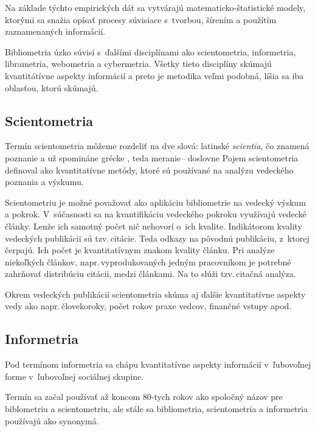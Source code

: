 Na základe týchto empirických dát sa vytvárajú matematicko-štatistické modely,
ktorými sa snažia opísať procesy súvisiace s~tvorbou, šírením a použítím
zaznamenaných informácií.

Bibliometria úzko súvisí s~ďalšími disciplínami ako scientometria, informetria,
librametria, webometria a cybermetria.  Všetky tieto disciplíny skúmajú
kvantitátívne aspekty informácií a preto je metodika veľmi podobná, líšia sa iba
oblasťou, ktorú skúmajú.


\subsection{Scientometria}

Termín scientometria môžeme rozdeliť na dve slová: latinské
\emph{scientia}, čo znamená poznanie a už
spomináne grécke , teda
meranie\,--\,doslovne  Pojem scientometria
\cite{Nalimov1969} definoval ako kvantitatívne metódy, ktoré sú používané na
analýzu vedeckého poznania a výskumu.

Scientometriu je možné považovať ako aplikáciu bibliometrie na vedecký výskum a
pokrok.  V~súčasnosti sa na kvantifikáciu vedeckého pokroku využívajú vedecké
články.  Lenže ich samotný počet nič nehovorí o~ich kvalite.  Indikátorom
kvality vedeckých publikácii sú tzv.\,citácie.  Teda odkazy na pôvodnú
publikáciu, z~ktorej čerpajú.  Ich počet je kvantitatívnym znakom kvality
článku.  Pri analýze niekoľkých článkov, napr.\,vyprodukovaných jedným
pracovníkom je potrebné zahrňovať distribúciu citácii, medzi článkami.  Na to
slúži tzv.\,citačná analýza.

Okrem vedeckých publikácií scientometria skúma aj ďalšie kvantitatívne aspekty
vedy ako napr.\,človekoroky, počet rokov praxe vedcov, finančné vstupy apod.
\citep{Bellis2009}

\subsection{Informetria}

Pod termínom informetria sa chápu kvantitatívne aspekty
informácií v~ľubovoľnej forme v~ľubovoľnej sociálnej skupine.

Termín sa začal používať až koncom 80-tych rokov ako spoločný názov pre
biblometriu a scientometriu, ale stále sa bibliometria, scientometria a
informetria používajú ako synonymá.



